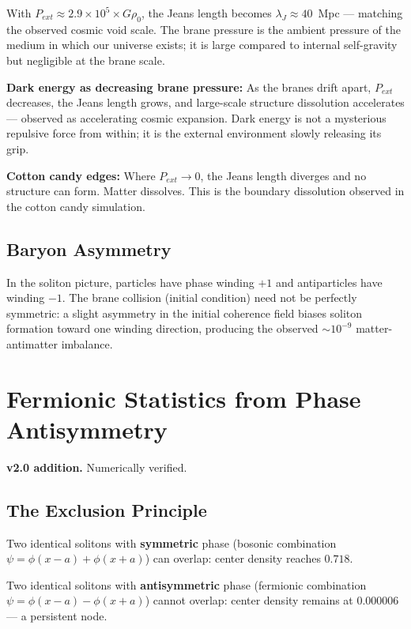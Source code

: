 \documentclass[11pt, a4paper]{article}
\begin{document}
With $P_{ext} \approx 2.9 \times 10^5 \times G\rho_0$, the Jeans length
becomes $\lambda_J \approx 40$~Mpc --- matching the observed cosmic void
scale. The brane pressure is the ambient pressure of the medium in which
our universe exists; it is large compared to internal self-gravity but
negligible at the brane scale.

\textbf{Dark energy as decreasing brane pressure:} As the branes drift
apart, $P_{ext}$ decreases, the Jeans length grows, and large-scale
structure dissolution accelerates --- observed as accelerating cosmic
expansion. Dark energy is not a mysterious repulsive force from within;
it is the external environment slowly releasing its grip.

\textbf{Cotton candy edges:} Where $P_{ext} \to 0$, the Jeans length
diverges and no structure can form. Matter dissolves. This is the
boundary dissolution observed in the cotton candy simulation.

\subsection{Baryon Asymmetry}

In the soliton picture, particles have phase winding $+1$ and
antiparticles have winding $-1$. The brane collision (initial condition)
need not be perfectly symmetric: a slight asymmetry in the initial
coherence field biases soliton formation toward one winding direction,
producing the observed $\sim 10^{-9}$ matter-antimatter imbalance.

\section{Fermionic Statistics from Phase Antisymmetry}
\label{sec:fermionic}

\textbf{v2.0 addition.} Numerically verified.

\subsection{The Exclusion Principle}

Two identical solitons with \textbf{symmetric} phase (bosonic
combination $\psi = \phi(x-a) + \phi(x+a)$) can overlap: center
density reaches $0.718$.

Two identical solitons with \textbf{antisymmetric} phase (fermionic
combination $\psi = \phi(x-a) - \phi(x+a)$) cannot overlap: center
density remains at $0.000006$ --- a persistent node.
\end{document}
